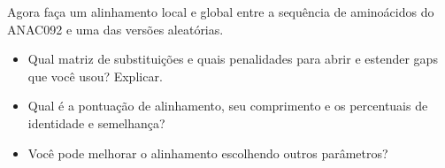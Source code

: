 \documentclass[letter,11pt]{book}
\begin{document}
Agora faça um alinhamento local e global entre a sequência de aminoácidos do ANAC092 e uma das versões aleatórias.

{\color{red}
\begin{itemize}
\item Qual matriz de substituições e quais penalidades para abrir e estender gaps que você usou? Explicar.
\item Qual é a pontuação de alinhamento, seu comprimento e os percentuais de identidade e semelhança?
\item Você pode melhorar o alinhamento escolhendo outros parâmetros?
\end{itemize}
}
%
%
%
%
%
%
%
\end{document}
